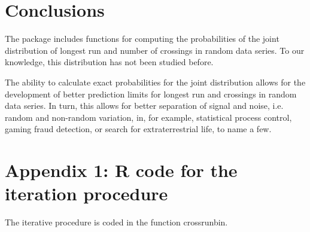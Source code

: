\section{Conclusions}
 
The  package includes functions for computing the probabilities of the joint distribution of longest run and number of crossings in random data series. To our knowledge, this distribution has not been studied before.
 
The ability to calculate exact probabilities for the joint distribution allows for the development of better prediction limits for longest run and crossings in random data series. In turn, this allows for better separation of signal and noise, i.e. random and non-random variation, in, for example, statistical process control, gaming fraud detection, or search for extraterrestrial life, to name a few.

\section{Appendix 1: R code for the iteration procedure}

The iterative procedure is coded in the function crossrunbin. 

